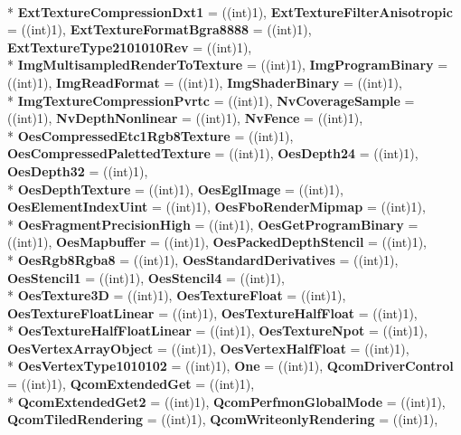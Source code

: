 \begin{DoxyCompactItemize}
\\*
{\bfseries Ext\-Texture\-Compression\-Dxt1} = ((int)1), 
{\bfseries Ext\-Texture\-Filter\-Anisotropic} = ((int)1), 
{\bfseries Ext\-Texture\-Format\-Bgra8888} = ((int)1), 
{\bfseries Ext\-Texture\-Type2101010\-Rev} = ((int)1), 
\\*
{\bfseries Img\-Multisampled\-Render\-To\-Texture} = ((int)1), 
{\bfseries Img\-Program\-Binary} = ((int)1), 
{\bfseries Img\-Read\-Format} = ((int)1), 
{\bfseries Img\-Shader\-Binary} = ((int)1), 
\\*
{\bfseries Img\-Texture\-Compression\-Pvrtc} = ((int)1), 
{\bfseries Nv\-Coverage\-Sample} = ((int)1), 
{\bfseries Nv\-Depth\-Nonlinear} = ((int)1), 
{\bfseries Nv\-Fence} = ((int)1), 
\\*
{\bfseries Oes\-Compressed\-Etc1\-Rgb8\-Texture} = ((int)1), 
{\bfseries Oes\-Compressed\-Paletted\-Texture} = ((int)1), 
{\bfseries Oes\-Depth24} = ((int)1), 
{\bfseries Oes\-Depth32} = ((int)1), 
\\*
{\bfseries Oes\-Depth\-Texture} = ((int)1), 
{\bfseries Oes\-Egl\-Image} = ((int)1), 
{\bfseries Oes\-Element\-Index\-Uint} = ((int)1), 
{\bfseries Oes\-Fbo\-Render\-Mipmap} = ((int)1), 
\\*
{\bfseries Oes\-Fragment\-Precision\-High} = ((int)1), 
{\bfseries Oes\-Get\-Program\-Binary} = ((int)1), 
{\bfseries Oes\-Mapbuffer} = ((int)1), 
{\bfseries Oes\-Packed\-Depth\-Stencil} = ((int)1), 
\\*
{\bfseries Oes\-Rgb8\-Rgba8} = ((int)1), 
{\bfseries Oes\-Standard\-Derivatives} = ((int)1), 
{\bfseries Oes\-Stencil1} = ((int)1), 
{\bfseries Oes\-Stencil4} = ((int)1), 
\\*
{\bfseries Oes\-Texture3\-D} = ((int)1), 
{\bfseries Oes\-Texture\-Float} = ((int)1), 
{\bfseries Oes\-Texture\-Float\-Linear} = ((int)1), 
{\bfseries Oes\-Texture\-Half\-Float} = ((int)1), 
\\*
{\bfseries Oes\-Texture\-Half\-Float\-Linear} = ((int)1), 
{\bfseries Oes\-Texture\-Npot} = ((int)1), 
{\bfseries Oes\-Vertex\-Array\-Object} = ((int)1), 
{\bfseries Oes\-Vertex\-Half\-Float} = ((int)1), 
\\*
{\bfseries Oes\-Vertex\-Type1010102} = ((int)1), 
{\bfseries One} = ((int)1), 
{\bfseries Qcom\-Driver\-Control} = ((int)1), 
{\bfseries Qcom\-Extended\-Get} = ((int)1), 
\\*
{\bfseries Qcom\-Extended\-Get2} = ((int)1), 
{\bfseries Qcom\-Perfmon\-Global\-Mode} = ((int)1), 
{\bfseries Qcom\-Tiled\-Rendering} = ((int)1), 
{\bfseries Qcom\-Writeonly\-Rendering} = ((int)1), 

\end{DoxyCompactItemize}
